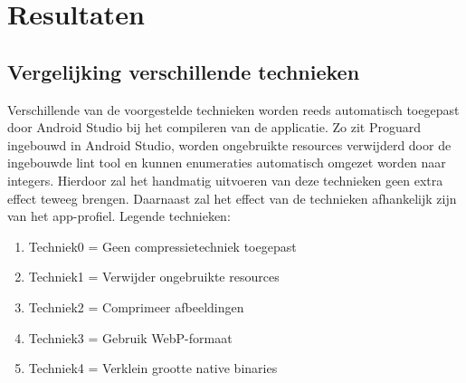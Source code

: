 
\chapter{Resultaten}
\label{ch:resultaten}

\section{Vergelijking verschillende technieken}
\label{sec:technieken}

Verschillende van de voorgestelde technieken worden reeds automatisch toegepast door Android Studio bij het compileren van de applicatie. Zo zit Proguard ingebouwd in Android Studio, worden ongebruikte resources verwijderd door de ingebouwde lint tool en kunnen enumeraties automatisch omgezet worden naar integers. Hierdoor zal het handmatig uitvoeren van deze technieken geen extra effect teweeg brengen. Daarnaast zal het effect van de technieken afhankelijk zijn van het app-profiel. 
Legende technieken: 
\begin{enumerate}
	\item Techniek0 = Geen compressietechniek toegepast
	\item Techniek1 = Verwijder ongebruikte resources
	\item Techniek2 = Comprimeer afbeeldingen
	\item Techniek3 = Gebruik WebP-formaat
	\item Techniek4 = Verklein grootte native binaries
\end{enumerate}
